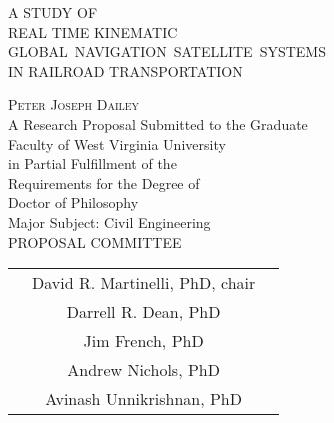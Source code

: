 \thispagestyle{empty}
\begin{center}
	\large{ A STUDY OF \\
	REAL TIME KINEMATIC\\
	\mbox{GLOBAL NAVIGATION SATELLITE SYSTEMS}\\
	IN RAILROAD TRANSPORTATION}\\
	 \end{center}
\begin{center}
\vspace{6pt}
\textsc{Peter Joseph Dailey}\\
\SingleSpacing A Research Proposal Submitted to the Graduate\\
Faculty of West Virginia University\\
in Partial Fulfillment of the\\
Requirements for the Degree of\\
Doctor of Philosophy\\
Major Subject: Civil Engineering
\vspace{20pt}\\
PROPOSAL COMMITTEE\\ 
\vspace{50pt}
\begin{tabular}{c c c}
&  &  \\
\hline
&David R. Martinelli, PhD, chair&\vspace{40pt}\\ \hline
&Darrell R. Dean, PhD&\vspace{40pt}\\ \hline
&Jim French, PhD&\vspace{40pt}\\ \hline
&Andrew Nichols, PhD&\vspace{40pt}\\ \hline
&Avinash Unnikrishnan, PhD \\
\end{tabular}
\end{center}